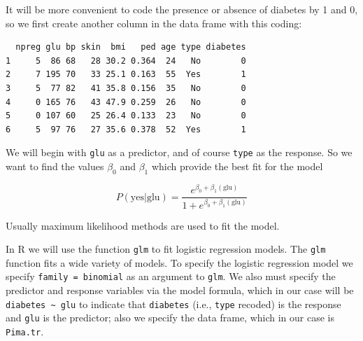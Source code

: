 \documentclass[
]{krantz}
\makeatletter
\newenvironment{Shaded}{\begin{snugshade}}{\end{snugshade}}
\newcommand{\DecValTok}[1]{\textcolor[rgb]{0.06,0.06,0.06}{#1}}
\newcommand{\KeywordTok}[1]{\textcolor[rgb]{0.27,0.27,0.27}{\textbf{#1}}}
\newcommand{\NormalTok}[1]{#1}
\newcommand{\OperatorTok}[1]{\textcolor[rgb]{0.43,0.43,0.43}{\textbf{#1}}}
\newcommand{\StringTok}[1]{\textcolor[rgb]{0.5,0.5,0.5}{#1}}
\newenvironment{kframe}{%
\medskip{}
\setlength{\fboxsep}{.8em}
 \def\at@end@of@kframe{}%
 \ifinner\ifhmode%
  \def\at@end@of@kframe{\end{minipage}}%
  \begin{minipage}{\columnwidth}%
 \fi\fi%
 \def\FrameCommand##1{\hskip\@totalleftmargin \hskip-\fboxsep
 \colorbox{shadecolor}{##1}\hskip-\fboxsep
     \hskip-\linewidth \hskip-\@totalleftmargin \hskip\columnwidth}%
 \MakeFramed {\advance\hsize-\width
   \@totalleftmargin\z@ \linewidth\hsize
   \@setminipage}}%
 {\par\unskip\endMakeFramed%
 \at@end@of@kframe}
\renewenvironment{Shaded}{\begin{kframe}}{\end{kframe}}
\makeatother
\begin{document}
It will be more convenient to code the presence or absence of diabetes by 1 and 0, so we first create another column in the data frame with this coding:

\begin{Shaded}
\end{Shaded}

\begin{verbatim}
  npreg glu bp skin  bmi   ped age type diabetes
1     5  86 68   28 30.2 0.364  24   No        0
2     7 195 70   33 25.1 0.163  55  Yes        1
3     5  77 82   41 35.8 0.156  35   No        0
4     0 165 76   43 47.9 0.259  26   No        0
5     0 107 60   25 26.4 0.133  23   No        0
6     5  97 76   27 35.6 0.378  52  Yes        1
\end{verbatim}

We will begin with \texttt{glu} as a predictor, and of course \texttt{type} as the response. So we want to find the values \(\beta_0\) and \(\beta_1\) which provide the best fit for the model

\[
P(\text{yes} | \text{glu}) = \frac{e^{\beta_0 + \beta_1 (\text{glu})}}{1 + e^{\beta_0 + \beta_1 (\text{glu})}}
\]

Usually maximum likelihood methods are used to fit the model.

In R we will use the function \texttt{glm} to fit logistic regression models. The \texttt{glm} function fits a wide variety of models. To specify the logistic regression model we specify \texttt{family\ =\ binomial} as an argument to \texttt{glm}. We also must specify the predictor and response variables via the model formula, which in our case will be \texttt{diabetes\ \textasciitilde{}\ glu} to indicate that \texttt{diabetes} (i.e., \texttt{type} recoded) is the response and \texttt{glu} is the predictor; also we specify the data frame, which in our case is \texttt{Pima.tr}.
\end{document}

